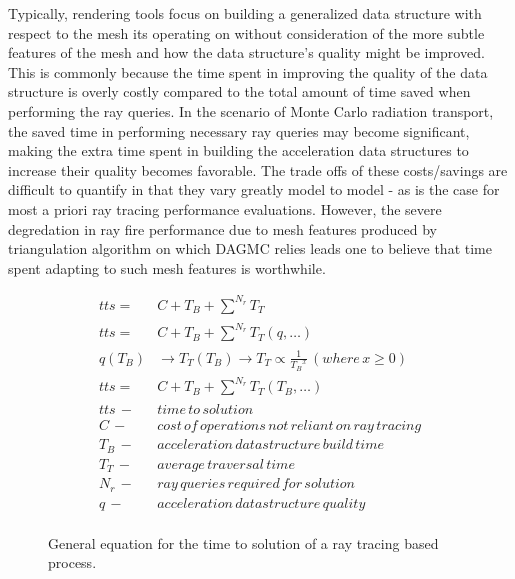 \documentclass[12pt, a4paper]{article}
\begin{document}
Typically, rendering tools focus on building a generalized data structure with respect to the mesh its operating on without consideration of the more subtle features of the mesh and how the data structure's quality might be improved. This is commonly because the time spent in improving the quality of the data structure is overly costly compared to the total amount of time saved when performing the ray queries. In the scenario of Monte Carlo radiation transport, the saved time in performing necessary ray queries may become significant, making the extra time spent in building the acceleration data structures to increase their quality becomes favorable. The trade offs of these costs/savings are difficult to quantify in that they vary greatly model to model - as is the case for most a priori ray tracing performance evaluations. However, the severe degredation in ray fire performance due to mesh features produced by triangulation algorithm on which DAGMC relies leads one to believe that time spent adapting to such mesh features is worthwhile.

\begin{figure}[H]
  \centering
  \begin{align*}
    tts =\, & C + T_{B} + \sum_{}^{N_{r}} T_{T} \\
    tts =\, & C + T_{B} + \sum_{}^{N_{r}} T_{T}(q,\ldots) \\
    q(T_{B}) & \rightarrow T_{T}(T_{B}) \rightarrow T_{T} \propto \frac{1}{{T_{B}}^{x}} \, (where \, x \geq 0) \\
    tts =\, & C + T_{B} + \sum_{}^{N_{r}} T_{T}(T_{B},\ldots) \\
    tts \, - & time\, to\, solution \\
    C \, - & cost\, of\, operations \, not \, reliant \, on \, ray \, tracing \\
    T_{B} \, - & acceleration\, data structure\, build\, time \\
    T_{T} \, - & average\, traversal\, time \\
    N_{r} \, - & ray\, queries \, required\, for\, solution \\
    q \, - & acceleration\, data structure\, quality \\
  \end{align*}
  \caption{General equation for the time to solution of a ray tracing based process.}
  \label{tts_est}
\end{figure}
\end{document}
